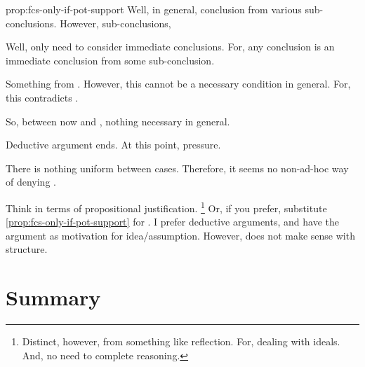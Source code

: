 \begin{note}
\begin{argument}{prop:fcs-only-if-pot-support}
    Well, in general, conclusion from various sub-conclusions.
    However, sub-conclusions,

    Well, only need to consider immediate conclusions.
    For, any conclusion is an immediate conclusion from some sub-conclusion.

    \smallskip
    Something from \pevent{}.
    However, this cannot be a necessary condition in general.
    For, this contradicts \supportII{}.

    So, between now and \pevent{}, nothing necessary in general.

    \smallskip
    Deductive argument ends.
    At this point, pressure.

    There is nothing uniform between cases.
    Therefore, it seems no non-ad-hoc way of denying \ros{}.
  \end{argument}

  Think in terms of propositional justification.%
  \footnote{
    Distinct, however, from something like reflection.
    For, dealing with ideals.
    And, no need to complete reasoning.
  }
  Or, if you prefer, substitute \autoref{prop:fcs-only-if-pot-support} for \supportII{}.
  I prefer deductive arguments, and have the argument as motivation for idea/assumption.
  However, does not make sense with structure.
\end{note}

\section*{Summary}

